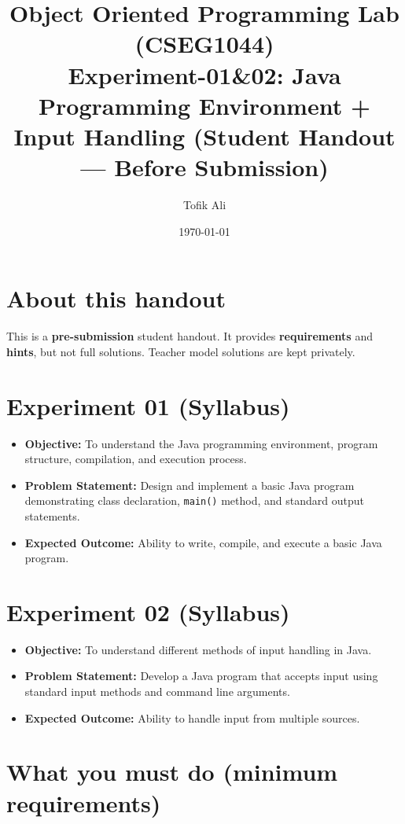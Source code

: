 \documentclass[11pt]{article}
\title{Object Oriented Programming Lab (CSEG1044)\\Experiment-01\&02: Java Programming Environment + Input Handling (Student Handout --- Before Submission)}
\author{Tofik Ali}
\date{\today}
\begin{document}
\maketitle
\tableofcontents

\section{About this handout}
This is a \textbf{pre-submission} student handout.
It provides \textbf{requirements} and \textbf{hints}, but not full solutions.
Teacher model solutions are kept privately.

\section{Experiment 01 (Syllabus)}
\begin{itemize}[leftmargin=*]
  \item \textbf{Objective:} To understand the Java programming environment, program structure, compilation, and execution process.
  \item \textbf{Problem Statement:} Design and implement a basic Java program demonstrating class declaration, \texttt{main()} method, and standard output statements.
  \item \textbf{Expected Outcome:} Ability to write, compile, and execute a basic Java program.
\end{itemize}

\section{Experiment 02 (Syllabus)}
\begin{itemize}[leftmargin=*]
  \item \textbf{Objective:} To understand different methods of input handling in Java.
  \item \textbf{Problem Statement:} Develop a Java program that accepts input using standard input methods and command line arguments.
  \item \textbf{Expected Outcome:} Ability to handle input from multiple sources.
\end{itemize}

\section{What you must do (minimum requirements)}
\end{document}
